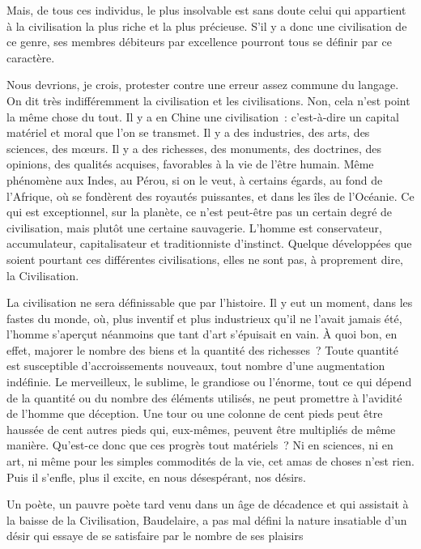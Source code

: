 \documentclass[french,twoside]{book} %
\begin{document}
\noindent Mais, de tous ces individus, le plus insolvable est sans doute celui qui appartient à la civilisation la plus riche et la plus précieuse. S’il y a donc une civilisation de ce genre, ses membres débiteurs par excellence pourront tous se définir par ce caractère.\par
Nous devrions, je crois, protester contre une erreur assez commune du langage. On dit très indifféremment la civilisation et les civilisations. Non, cela n’est point la même chose du tout. Il y a en Chine une civilisation : c’est-à-dire un capital matériel et moral que l’on se transmet. Il y a des industries, des arts, des sciences, des mœurs. Il y a des richesses, des monuments, des doctrines, des opinions, des qualités acquises, favorables à la vie de l’être humain. Même phénomène aux Indes, au Pérou, si on le veut, à certains égards, au fond de l’Afrique, où se fondèrent des royautés puissantes, et dans les îles de l’Océanie. Ce qui est exceptionnel, sur la planète, ce n’est peut-être pas un certain degré de civilisation, mais plutôt une certaine sauvagerie. L’homme est conservateur, accumulateur, capitalisateur et traditionniste d’instinct. Quelque développées que soient pourtant ces différentes civilisations, elles ne sont pas, à proprement dire, la Civilisation.\par
La civilisation ne sera définissable que par l’histoire. Il y eut un moment, dans les fastes du monde, où, plus inventif et plus industrieux qu’il ne l’avait jamais été, l’homme s’aperçut néanmoins que tant d’art s’épuisait en vain. À quoi bon, en effet, majorer le nombre des biens et la quantité des richesses ? Toute quantité est susceptible d’accroissements nouveaux, tout nombre d’une augmentation indéfinie. Le merveilleux, le sublime, le grandiose ou l’énorme, tout ce qui dépend de la quantité ou du nombre des éléments utilisés, ne peut promettre à l’avidité de l’homme que déception. Une tour ou une colonne de cent pieds peut être haussée de cent autres pieds qui, eux-mêmes, peuvent être multipliés de même manière. Qu’est-ce donc que ces progrès tout matériels ? Ni en sciences, ni en art, ni même pour les simples commodités de la vie, cet amas de choses n’est rien. Puis il s’enfle, plus il excite, en nous désespérant, nos désirs.\par
Un poète, un pauvre poète tard venu dans un âge de décadence et qui assistait à la baisse de la Civilisation, Baudelaire, a pas mal défini la nature insatiable d’un désir qui essaye de se satisfaire par le nombre de ses plaisirs\par
\end{document}
